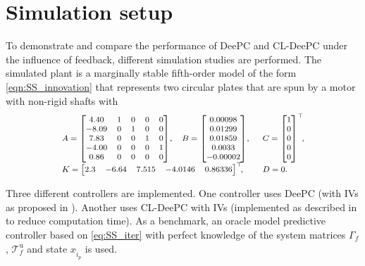 \section{Simulation setup}
\noindent To demonstrate and compare the performance of \ac{DeePC} and \ac{CL-DeePC} under the influence of feedback, different simulation studies are performed. The simulated plant is a marginally stable fifth-order 
model of the form \eqref{eqn:SS_innovation} that represents two circular plates that are spun by a motor with non-rigid shafts with \citep{Favoreel1999b}
\begin{align}\label{eq:SysFavoreel}
\scriptsize
\begin{array}{lll}
    A = \begin{bmatrix}
        4.40 & 1 & 0 & 0 & 0\\
       -8.09 & 0 & 1 & 0 & 0\\
        7.83 & 0 & 0 & 1 & 0\\
       -4.00 & 0 & 0 & 0 & 1\\
        0.86 & 0 & 0 & 0 & 0
    \end{bmatrix}\!,&
    B = \begin{bmatrix}
        0.00098\\
        0.01299\\
        0.01859\\
        0.0033\\
       -0.00002
    \end{bmatrix}\!,&C = \begin{bmatrix}
        1 \\ 0 \\ 0\\ 0\\ 0
    \end{bmatrix}^\top\mkern-7mu,\\
    K = \begin{bmatrix}
        2.3 & -6.64 & 7.515 & -4.0146 & 0.86336
    \end{bmatrix}^\top\mkern-7mu,\span
    &D=0.
\end{array}
\end{align}

Three different controllers are implemented. One controller uses \ac{DeePC} (with \ac{IVs} as proposed in \cite{vanWingerden2022}). Another uses \ac{CL-DeePC} with \ac{IVs} (implemented as described in  to reduce computation time). As a benchmark, an oracle model predictive controller based on \eqref{eq:SS_iter} with perfect knowledge of the system matrices $\Gamma_f$, $\mathcal{T}_f^\mathrm{u}$ and state $x_{\hat{i}_p}$ is used.

